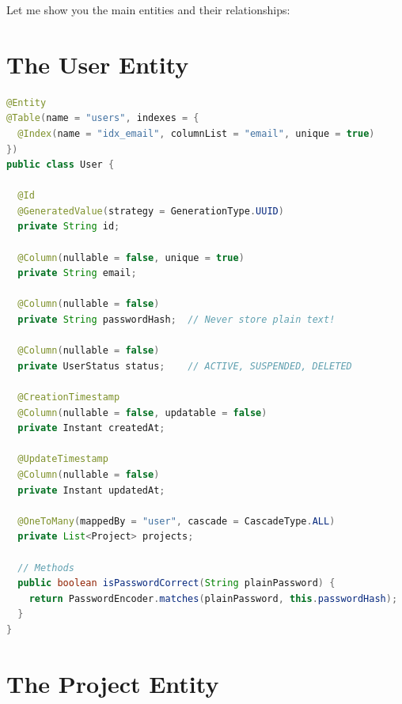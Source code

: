 \documentclass[11pt,a4paper]{report}
\begin{document}
Let me show you the main entities and their relationships:


\section{The User Entity}


\begin{lstlisting}[language=Java]
@Entity
@Table(name = "users", indexes = {
  @Index(name = "idx_email", columnList = "email", unique = true)
})
public class User {
  
  @Id
  @GeneratedValue(strategy = GenerationType.UUID)
  private String id;
  
  @Column(nullable = false, unique = true)
  private String email;
  
  @Column(nullable = false)
  private String passwordHash;  // Never store plain text!
  
  @Column(nullable = false)
  private UserStatus status;    // ACTIVE, SUSPENDED, DELETED
  
  @CreationTimestamp
  @Column(nullable = false, updatable = false)
  private Instant createdAt;
  
  @UpdateTimestamp
  @Column(nullable = false)
  private Instant updatedAt;
  
  @OneToMany(mappedBy = "user", cascade = CascadeType.ALL)
  private List<Project> projects;
  
  // Methods
  public boolean isPasswordCorrect(String plainPassword) {
    return PasswordEncoder.matches(plainPassword, this.passwordHash);
  }
}
\end{lstlisting}


\section{The Project Entity}
\end{document}
